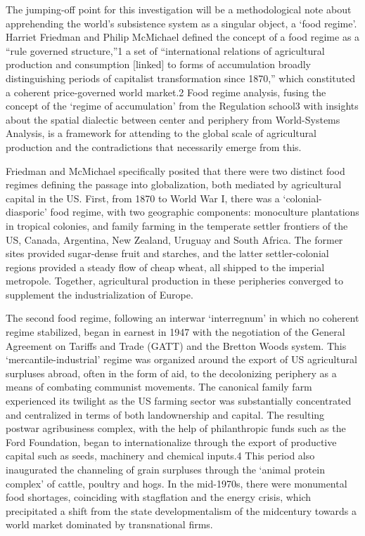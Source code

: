 \documentclass[
]{book}
\begin{document}
The jumping-off point for this investigation will be a methodological note about apprehending the world's subsistence system as a singular object, a `food regime'. Harriet Friedman and Philip McMichael defined the concept of a food regime as a ``rule governed structure,''1 a set of ``international relations of agricultural production and consumption {[}linked{]} to forms of accumulation broadly distinguishing periods of capitalist transformation since 1870,'' which constituted a coherent price-governed world market.2 Food regime analysis, fusing the concept of the `regime of accumulation' from the Regulation school3 with insights about the spatial dialectic between center and periphery from World-Systems Analysis, is a framework for attending to the global scale of agricultural production and the contradictions that necessarily emerge from this.

Friedman and McMichael specifically posited that there were two distinct food regimes defining the passage into globalization, both mediated by agricultural capital in the US. First, from 1870 to World War I, there was a `colonial-diasporic' food regime, with two geographic components: monoculture plantations in tropical colonies, and family farming in the temperate settler frontiers of the US, Canada, Argentina, New Zealand, Uruguay and South Africa. The former sites provided sugar-dense fruit and starches, and the latter settler-colonial regions provided a steady flow of cheap wheat, all shipped to the imperial metropole. Together, agricultural production in these peripheries converged to supplement the industrialization of Europe.

The second food regime, following an interwar `interregnum' in which no coherent regime stabilized, began in earnest in 1947 with the negotiation of the General Agreement on Tariffs and Trade (GATT) and the Bretton Woods system. This `mercantile-industrial' regime was organized around the export of US agricultural surpluses abroad, often in the form of aid, to the decolonizing periphery as a means of combating communist movements. The canonical family farm experienced its twilight as the US farming sector was substantially concentrated and centralized in terms of both landownership and capital. The resulting postwar agribusiness complex, with the help of philanthropic funds such as the Ford Foundation, began to internationalize through the export of productive capital such as seeds, machinery and chemical inputs.4 This period also inaugurated the channeling of grain surpluses through the `animal protein complex' of cattle, poultry and hogs. In the mid-1970s, there were monumental food shortages, coinciding with stagflation and the energy crisis, which precipitated a shift from the state developmentalism of the midcentury towards a world market dominated by transnational firms.
\end{document}
